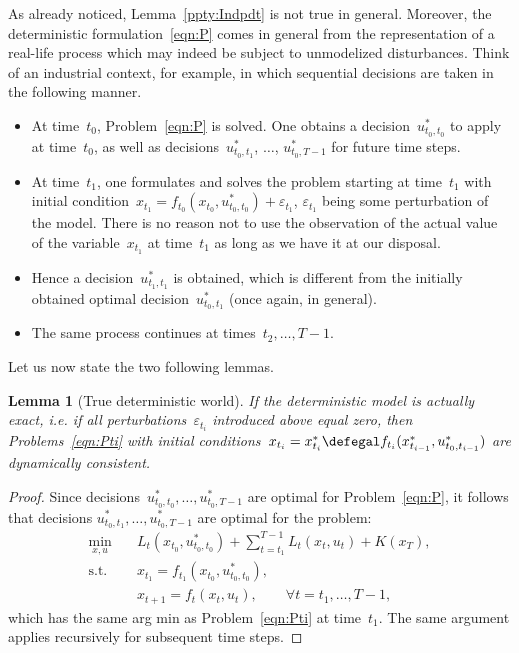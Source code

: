 \documentclass[a4paper]{amsart}
\theoremstyle{plain}
\newtheorem{lemma}{Lemma}
\theoremstyle{definition}
\theoremstyle{remark}
\begin{document}
As already noticed, Lemma~\ref{ppty:Indpdt} is not true in
general. Moreover, the deterministic formulation~\eqref{eqn:P}
comes in general from the representation of a real-life process
which may indeed be subject to unmodelized disturbances. Think of
an industrial context, for example, in which sequential decisions
are taken in the following manner.
\begin{itemize}
    \item At time~$t_0$, Problem~\eqref{eqn:P} is solved. One obtains
        a decision~$u_{t_0, t_0}^*$ to apply at time~$t_0$, as well as
        decisions~$u_{t_0, t_1}^*$, $\dots$, $u_{t_0, T-1}^*$ for future
        time steps.
    \item At time~$t_1$, one formulates and solves the
        problem starting at time~$t_1$ with initial
        condition~$x_{t_1}=f_{t_0}(x_{t_0}, u_{t_0, t_0}^*) +
        \varepsilon_{t_1}$, $\varepsilon_{t_1}$ being some perturbation of
        the model. There is
        no reason not to use the observation of the actual value of the
        variable~$x_{t_1}$ at time~$t_1$ as long as we have it at our disposal.
    \item Hence a decision~$u_{t_1, t_1}^*$ is obtained, which is
        different from the initially obtained optimal decision~$u_{t_0,
        t_1}^*$ (once again, in general).
    \item The same process continues at times~$t_2,\ldots, T-1$.
\end{itemize}
Let us now state the two following lemmas.

\begin{lemma}[True deterministic world] \label{ppty:Det}
    If the deterministic model is actually exact, i.e. if all
    perturbations~$\varepsilon_{t_i}$ introduced above equal zero,
    then Problems~\eqref{eqn:Pti} with initial conditions~$x_{t_i} =
    x_{t_i}^* \defegal f_{t_i}(x_{t_{i-1}}^*, u_{t_0, t_{i-1}}^*)$ are
    dynamically consistent.
\end{lemma}

\begin{proof}
    Since decisions~$u_{t_0, t_0}^*, \dots, u_{t_0, T-1}^*$ are
    optimal for Problem~\eqref{eqn:P}, it follows that
    decisions $u_{t_0, t_1}^*, \dots, u_{t_0, T-1}^*$
    are optimal for the problem:
    \begin{align*}
        \min_{x, u} \quad&  L_t\left(x_{t_0}, u_{t_0, t_0}^*\right) +
            \sum_{t=t_1}^{T-1} L_t\left(x_t, u_t\right) + K\left(x_T\right), \\
        \text{s.t.} \quad& x_{t_1} = f_{t_1}(x_{t_0}, u_{t_0, t_0}^*), \\
        & x_{t+1} = f_t\left(x_t, u_t\right), \qquad \forall t=t_1, \dots,
        T-1,
    \end{align*}
    which has the same arg min as Problem~\eqref{eqn:Pti} at time~$t_1$. The
    same argument applies recursively for subsequent time steps.
\end{proof}
\end{document}
